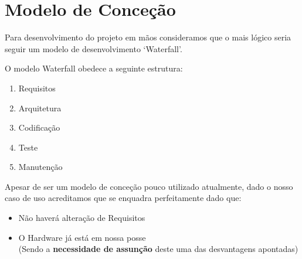 \chapter{Modelo de Conceção}

Para desenvolvimento do projeto em mãos consideramos que o mais lógico seria seguir um modelo de desenvolvimento `Waterfall'.

O modelo Waterfall obedece a seguinte estrutura:
\begin{enumerate}
    \item Requisitos
    \item Arquitetura
    \item Codificação
    \item Teste
    \item Manutenção
\end{enumerate}

Apesar de ser um modelo de conceção pouco utilizado atualmente, dado o nosso caso de uso acreditamos que se enquadra perfeitamente dado que:
\begin{itemize}
    \item Não haverá alteração de Requisitos
    \item O Hardware já está em nossa posse\\ (Sendo a \textbf{necessidade de assunção} deste uma das desvantagens apontadas)
\end{itemize}